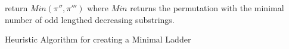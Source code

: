\begin{algorithm}
\begin{algorithmic}[1]
                \Else 
                    \State \small{return $Min(\pi'',\pi''')$ where $Min$ returns the permutation with the minimal number of odd lengthed decreasing substrings.}
                \EndIf

            \EndFunction
        
        \end{algorithmic} 
        \caption{Heuristic Algorithm for creating a Minimal Ladder}
        \label{Algo:heuristic}
\end{algorithm}
